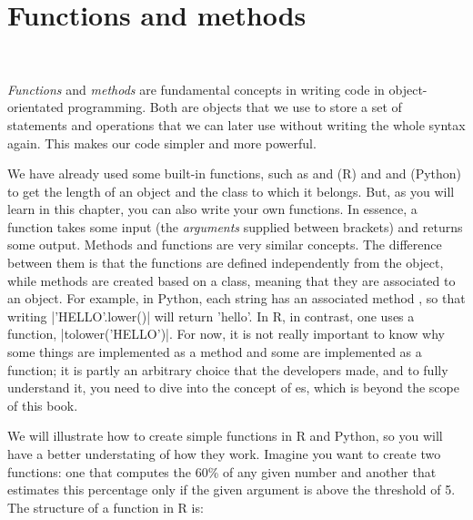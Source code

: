 \section{Functions and methods}\\
\label{sec:functions}

\emph{Functions} and \emph{methods} are fundamental concepts in
writing code in object-orientated programming. Both are objects that
we use to store a set of statements and operations that we can later
use without writing the whole syntax again. This makes our code
simpler and more powerful.

We have already used some built-in functions, such as  and
 (R) and  and  (Python) to get the length
of an object and the class to which it belongs. But, as you will learn
in this chapter, you can also write your own functions. In essence, a
function takes some input (the \emph{arguments} supplied between
brackets) and returns some output.  Methods and functions are very
similar concepts. The difference between them is that the functions
are defined independently from the object, while methods are created
based on a class, meaning that they are associated to an object. For
example, in Python, each string has an associated method ,
so that writing |'HELLO'.lower()| will return 'hello'. In R, in
contrast, one uses a function, |tolower('HELLO')|. For now, it is not
really important to know why some things are implemented as a method
and some are implemented as a function; it is partly an arbitrary
choice that the developers made, and to fully understand it, you need
to dive into the concept of es, which is beyond the scope of
this book.



We will illustrate how to create simple functions in R and Python, so you
will have a better understating of how they work. Imagine you want to
create two functions: one that computes the 60\% of any given number
and another that estimates this percentage only if the given argument
is above the threshold of 5. The structure of a function in R is:

